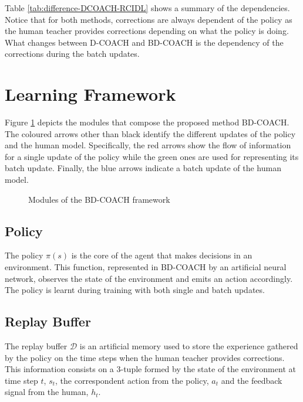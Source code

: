 Table \ref{tab:difference-DCOACH-RCIDL} shows a summary of the dependencies. Notice that for both methods, corrections are always dependent of the policy as the human teacher provides corrections depending on what the policy is doing. What changes between D-COACH and BD-COACH is the dependency of the corrections during the batch updates.



\section{Learning Framework}
\label{section:Proposed method: BD-COACH}

Figure \ref{fig:BD-COACH} depicts the modules that compose the proposed method BD-COACH. The coloured arrows other than black identify the different updates of the policy and the human model. Specifically, the red arrows show the flow of information for a single update of the policy while the green ones are used for representing its batch update. Finally, the blue arrows indicate a batch update of the human model.



\begin{figure}[H]
    \centering
    \caption{Modules of the BD-COACH framework}
    \label{fig:BD-COACH}
\end{figure}


\subsection*{Policy}

The policy $\pi(s)$ is the core of the agent that makes decisions in an environment. This function, represented in BD-COACH by an artificial neural network, observes the state of the environment and emits an action accordingly. The policy is learnt during training with both single and batch updates. 


\subsection*{Replay Buffer}
The replay buffer $\mathcal{D}$ is an artificial memory  used to store the experience gathered by the policy on the time steps when the human teacher provides corrections. This information consists on a 3-tuple formed by the state of the environment at time step $t$,  $s_t$, the correspondent action from the policy, $a_t$ and the feedback signal from the human, $h_t$. 

